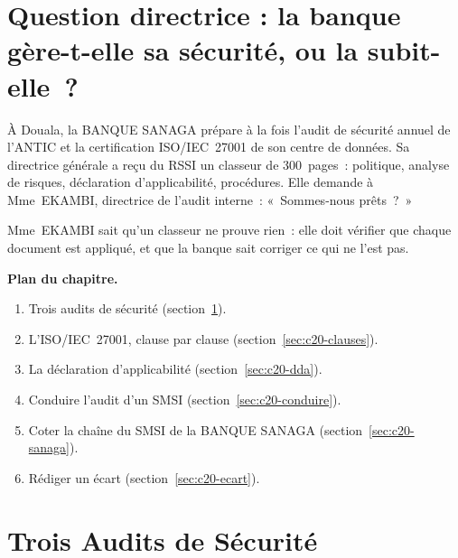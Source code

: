 \bigskip

\section*{Question directrice : la banque gère-t-elle sa sécurité, ou la subit-elle~?}

À Douala, la BANQUE SANAGA prépare à la fois l'audit de sécurité annuel de
l'ANTIC et la certification ISO/IEC~27001 de son centre de données. Sa
directrice générale a reçu du RSSI un classeur de 300~pages~: politique,
analyse de risques, déclaration d'applicabilité, procédures. Elle demande à
Mme~EKAMBI, directrice de l'audit interne~: «~Sommes-nous prêts~?~»

Mme~EKAMBI sait qu'un classeur ne prouve rien~: elle doit vérifier que
chaque document est appliqué, et que la banque sait corriger ce qui ne
l'est pas.

\medskip
\textbf{Plan du chapitre.}
\begin{enumerate}
    \item Trois audits de sécurité (section~\ref{sec:c20-trois}).
    \item L'ISO/IEC~27001, clause par clause (section~\ref{sec:c20-clauses}).
    \item La déclaration d'applicabilité (section~\ref{sec:c20-dda}).
    \item Conduire l'audit d'un SMSI (section~\ref{sec:c20-conduire}).
    \item Coter la chaîne du SMSI de la BANQUE SANAGA
          (section~\ref{sec:c20-sanaga}).
    \item Rédiger un écart (section~\ref{sec:c20-ecart}).
\end{enumerate}

\separateur

\section{Trois Audits de Sécurité}
\label{sec:c20-trois}

